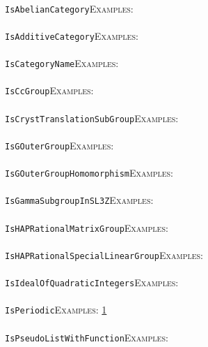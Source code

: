 \documentclass[a4paper,11pt]{report}
\begin{document}
{{ \\
 \texttt{IsAbelianCategory}{\nobreakspace}{\nobreakspace}{\nobreakspace}{\nobreakspace}\textsc{Examples:} \\
 \\
 \texttt{IsAdditiveCategory}{\nobreakspace}{\nobreakspace}{\nobreakspace}{\nobreakspace}\textsc{Examples:} \\
 \\
 \texttt{IsCategoryName}{\nobreakspace}{\nobreakspace}{\nobreakspace}{\nobreakspace}\textsc{Examples:} \\
 \\
 \texttt{IsCcGroup}{\nobreakspace}{\nobreakspace}{\nobreakspace}{\nobreakspace}\textsc{Examples:} \\
 \\
 \texttt{IsCrystTranslationSubGroup}{\nobreakspace}{\nobreakspace}{\nobreakspace}{\nobreakspace}\textsc{Examples:} \\
 \\
 \texttt{IsGOuterGroup}{\nobreakspace}{\nobreakspace}{\nobreakspace}{\nobreakspace}\textsc{Examples:} \\
 \\
 \texttt{IsGOuterGroupHomomorphism}{\nobreakspace}{\nobreakspace}{\nobreakspace}{\nobreakspace}\textsc{Examples:} \\
 \\
 \texttt{IsGammaSubgroupInSL3Z}{\nobreakspace}{\nobreakspace}{\nobreakspace}{\nobreakspace}\textsc{Examples:} \\
 \\
 \texttt{IsHAPRationalMatrixGroup}{\nobreakspace}{\nobreakspace}{\nobreakspace}{\nobreakspace}\textsc{Examples:} \\
 \\
 \texttt{IsHAPRationalSpecialLinearGroup}{\nobreakspace}{\nobreakspace}{\nobreakspace}{\nobreakspace}\textsc{Examples:} \\
 \\
 \texttt{IsIdealOfQuadraticIntegers}{\nobreakspace}{\nobreakspace}{\nobreakspace}{\nobreakspace}\textsc{Examples:} \\
 \\
 \texttt{IsPeriodic}{\nobreakspace}{\nobreakspace}{\nobreakspace}{\nobreakspace}\textsc{Examples:} \href{tutorial/chap10.html} {1}{\nobreakspace} \\
 \\
 \texttt{IsPseudoListWithFunction}{\nobreakspace}{\nobreakspace}{\nobreakspace}{\nobreakspace}\textsc{Examples:} \\
 \\
}}
\end{document}
